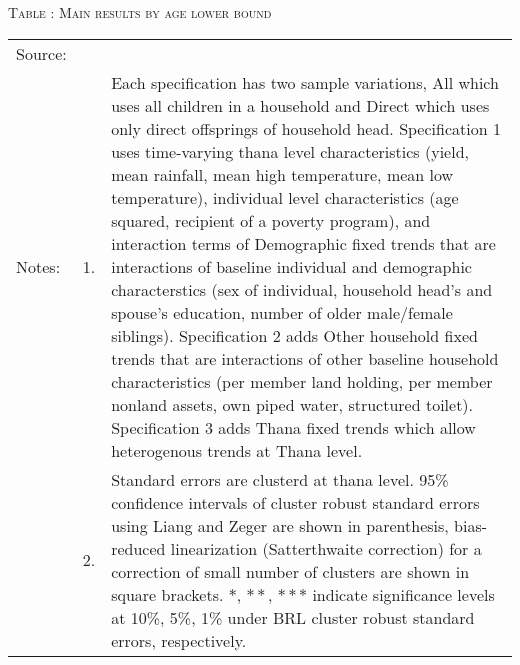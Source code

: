 \begin{table}
\hfil\textsc{\footnotesize Table \thetable: Main results by age lower bound\label{MainAgHHDefResultsTable1}}\\
\setlength{\tabcolsep}{1pt}
\renewcommand{\arraystretch}{.55}
\hfil

\renewcommand{\arraystretch}{1}
\hfil\begin{tabular}{>{\hfill\scriptsize}p{1cm}<{}>{\hfill\scriptsize}p{.5cm}<{}>{\scriptsize}p{12cm}<{\hfill}}
Source:& \multicolumn{2}{l}{\scriptsize Compiled from IFPRI data. }\\[-1ex]
Notes:& 1. & Each specification has two sample variations, \textsf{All} which uses all children in a household and \textsf{Direct} which uses only direct offsprings of household head. \textsf{Specification 1} uses time-varying thana level characteristics (yield, mean rainfall, mean high temperature, mean low temperature), individual level characteristics (age squared, recipient of a poverty program), and interaction terms of \textsf{Demographic fixed trends} that are interactions of baseline individual and demographic characterstics (sex of individual, household head's and spouse's education, number of older male/female siblings). \textsf{Specification 2} adds \textsf{Other household fixed trends} that are interactions of other baseline household characteristics (per member land holding, per member nonland assets, own piped water, structured toilet). \textsf{Specification 3} adds \textsf{Thana fixed trends} which allow heterogenous trends at Thana level. \\[-1ex]
& 2. & Standard errors are clusterd at thana level. 95\% confidence intervals of cluster robust standard errors using Liang and Zeger are shown in parenthesis, bias-reduced linearization (Satterthwaite correction) for a correction of small number of clusters are shown in square brackets. $*$, $**$, $***$ indicate significance levels at 10\%, 5\%, 1\% under BRL cluster robust standard errors, respectively.\end{tabular}
\end{table}

